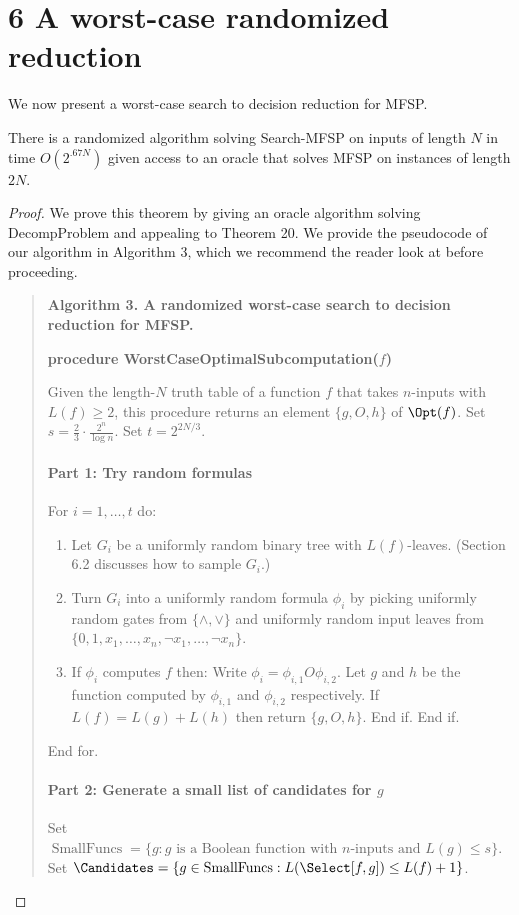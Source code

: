 \section*{6 A worst-case randomized reduction}
We now present a worst-case search to decision reduction for MFSP.
\setcounter{nttheorem}{40}
\begin{nttheorem}
There is a randomized algorithm solving Search-MFSP on inputs of length $N$ in time $O(2^{.67N})$ given access to an oracle that solves MFSP on instances of length $2N$.
\end{nttheorem}
\begin{proof}
We prove this theorem by giving an oracle algorithm solving DecompProblem and appealing to Theorem 20. We provide the pseudocode of our algorithm in Algorithm 3, which we recommend the reader look at before proceeding.
\begin{quote}\textbf{Algorithm 3. A randomized worst-case search to decision reduction for MFSP.}\par
\textbf{procedure WorstCaseOptimalSubcomputation($f$)}\par
Given the length-$N$ truth table of a function $f$ that takes $n$-inputs with $L(f)\geq 2$, this procedure returns an element $\{g,O,h\}$ of $\Opt(f)$. Set $s=\frac 23\cdot\frac{2^n}{\log n}$. Set $t=2^{2N/3}$.
\paragraph{Part 1: Try random formulas}
For $i=1,\ldots,t$ do:
\begin{enumerate}
\item Let $G_i$ be a uniformly random binary tree with $L(f)$-leaves. (Section 6.2 discusses how to sample $G_i$.)
\item Turn $G_i$ into a uniformly random formula $\phi_i$ by picking uniformly random gates from $\{\land,\lor\}$ and uniformly random input leaves from $\{0,1,x_1,\ldots,x_n,\neg x_1,\ldots,\neg x_n\}$.
\item If $\phi_i$ computes $f$ then: Write $\phi_i=\phi_{i,1}O\phi_{i,2}$. Let $g$ and $h$ be the function computed by $\phi_{i,1}$ and $\phi_{i,2}$ respectively. If $L(f)=L(g)+L(h)$ then return $\{g,O,h\}$. End if. End if.
\end{enumerate}
End for.
\paragraph{Part 2: Generate a small list of candidates for $g$}
Set $\operatorname{SmallFuncs}=\{g:g\text{ is a Boolean function with }n\text{-inputs and }L(g)\leq s\}$. Set $\Candidates=\{g\in\operatorname{SmallFuncs}:L(\Select[f,g])\leq L(f)+1\}$.

\end{quote}
\end{proof}
